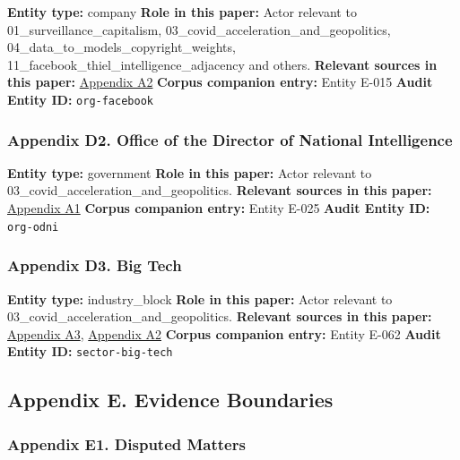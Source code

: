 \documentclass[
  american,
  11pt,
  letterpaper,
]{article}
\begin{document}
\textbf{Entity type:} company \textbf{Role in this paper:} Actor
relevant to 01\_surveillance\_capitalism,
03\_covid\_acceleration\_and\_geopolitics,
04\_data\_to\_models\_copyright\_weights,
11\_facebook\_thiel\_intelligence\_adjacency and others.
\textbf{Relevant sources in this paper:}
\hyperref[appendix-a2-big-tech-announces-striking-pandemic-gains-as-small-businesses-strain-to-find-their-footing]{Appendix
A2} \textbf{Corpus companion entry:} Entity E-015 \textbf{Audit Entity
ID:} \texttt{org-facebook}

\subsubsection{Appendix D2. Office of the Director of National
Intelligence}\label{appendix-d2-office-of-the-director-of-national-intelligence}

\textbf{Entity type:} government \textbf{Role in this paper:} Actor
relevant to 03\_covid\_acceleration\_and\_geopolitics. \textbf{Relevant
sources in this paper:}
\hyperref[appendix-a1-report-on-potential-links-between-the-wuhan-institute-of-virology-and-the-origins-of-covid-19]{Appendix
A1} \textbf{Corpus companion entry:} Entity E-025 \textbf{Audit Entity
ID:} \texttt{org-odni}

\subsubsection{Appendix D3. Big Tech}\label{appendix-d3-big-tech}

\textbf{Entity type:} industry\_block \textbf{Role in this paper:} Actor
relevant to 03\_covid\_acceleration\_and\_geopolitics. \textbf{Relevant
sources in this paper:}
\hyperref[appendix-a3-pandemic-provides-a-techlash-reprieve]{Appendix
A3},
\hyperref[appendix-a2-big-tech-announces-striking-pandemic-gains-as-small-businesses-strain-to-find-their-footing]{Appendix
A2} \textbf{Corpus companion entry:} Entity E-062 \textbf{Audit Entity
ID:} \texttt{sector-big-tech}

\subsection{Appendix E. Evidence
Boundaries}\label{appendix-e.-evidence-boundaries}

\subsubsection{Appendix E1. Disputed
Matters}\label{appendix-e1-disputed-matters}
\end{document}
